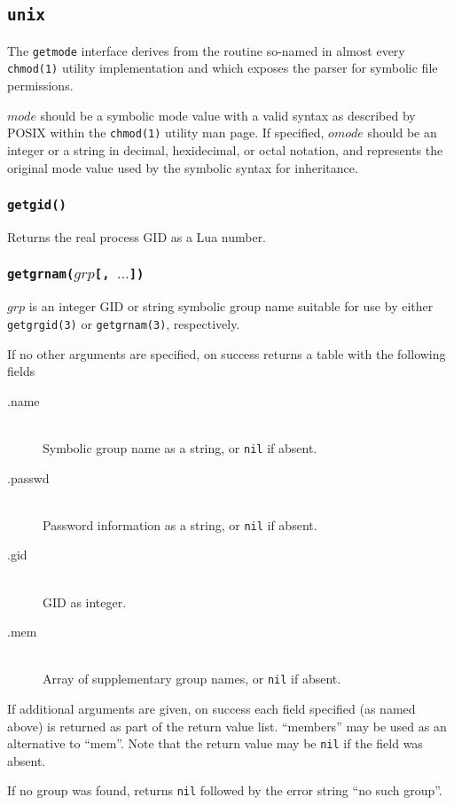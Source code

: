 \documentclass[11pt, oneside]{memoir}
\newcommand*{\nil}[0]{\texttt{nil}\xspace}
\newcommand*{\syscall}[1]{\texttt{#1}\xspace}
\newcommand*{\fn}[1]{\texttt{#1}\xspace}
\newcounter{toccols}
\newenvironment{Module}[1]{
	\subsection{\texttt{#1}}
	\addtocontents{toc}{
		\protect\begin{multicols}{\value{toccols}}
	}
}{
	\addtocontents{toc}{\protect\end{multicols}}
}
\begin{document}
\begin{Module}{unix}
The \fn{getmode} interface derives from the routine so-named in almost every \texttt{chmod(1)} utility implementation and which exposes the parser for symbolic file permissions.

$mode$ should be a symbolic mode value with a valid syntax as described by POSIX within the \syscall{chmod(1)} utility man page. If specified, $omode$ should be an integer or a string in decimal, hexidecimal, or octal notation, and represents the original mode value used by the symbolic syntax for inheritance.

\subsubsection[\fn{getgid}]{\fn{getgid()}}

Returns the real process GID as a Lua number.

\subsubsection[\fn{getgrnam}]{\fn{getgrnam($grp$[, $\ldots$])}}

$grp$ is an integer GID or string symbolic group name suitable for use by either \syscall{getgrgid(3)} or \syscall{getgrnam(3)}, respectively.

If no other arguments are specified, on success returns a table with the following fields

\begin{description}
\item[.name] \hfill \\
Symbolic group name as a string, or \nil if absent.
\item[.passwd] \hfill \\
Password information as a string, or \nil if absent.
\item[.gid] \hfill \\
GID as integer.
\item[.mem] \hfill \\
Array of supplementary group names, or \nil if absent.
\end{description}

If additional arguments are given, on success each field specified (as named above) is returned as part of the return value list. ``members'' may be used as an alternative to ``mem''. Note that the return value may be \nil if the field was absent.

If no group was found, returns \nil followed by the error string ``no such group''.


\end{Module}
\end{document}
